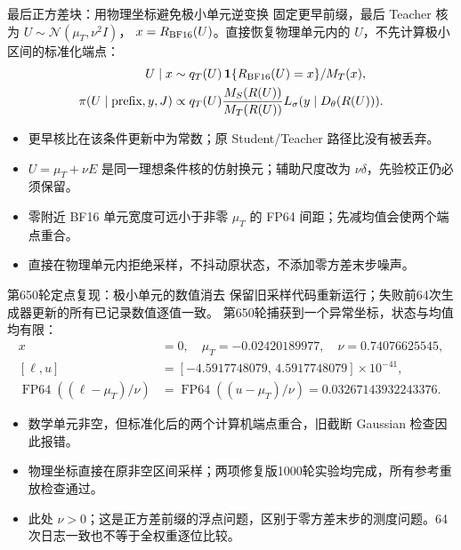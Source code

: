 \documentclass[10pt,aspectratio=169]{beamer}
\newcommand{\N}{\mathcal N}
\begin{document}
\begin{frame}{最后正方差块：用物理坐标避免极小单元逆变换}
\small
固定更早前缀，最后 Teacher 核为 $U\sim\N(\mu_T,\nu^2I)$，
$x=R_{\rm BF16}(U)$。直接恢复物理单元内的 $U$，不先计算极小区间的标准化端点：
\begin{align}
U\mid x&\sim q_T(U)\,\mathbf1\{R_{\rm BF16}(U)=x\}/M_T(x),\\
\pi(U\mid\text{prefix},y,J)&\propto q_T(U)
\frac{M_S(R(U))}{M_T(R(U))}L_\sigma(y\mid D_\theta(R(U))).
\end{align}
\begin{itemize}\itemsep5pt
\item 更早核比在该条件更新中为常数；原 Student/Teacher 路径比没有被丢弃。
\item $U=\mu_T+\nu E$ 是同一理想条件核的仿射换元；辅助尺度改为 $\nu\delta$，先验校正仍必须保留。
\item 零附近 BF16 单元宽度可远小于非零 $\mu_T$ 的 FP64 间距；先减均值会使两个端点重合。
\item 直接在物理单元内拒绝采样，不抖动原状态，不添加零方差末步噪声。
\end{itemize}
\end{frame}

\begin{frame}{第650轮定点复现：极小单元的数值消去}
\small
保留旧采样代码重新运行；失败前64次生成器更新的所有已记录数值逐值一致。
第650轮捕获到一个异常坐标，状态与均值均有限：
\begin{align}
x&=0,\quad \mu_T=-0.02420189977,\quad \nu=0.74076625545,\\
[\ell,u]&=[-4.5917748079,\,4.5917748079]\times10^{-41},\\
\operatorname{FP64}((\ell-\mu_T)/\nu)
&=\operatorname{FP64}((u-\mu_T)/\nu)=0.03267143932243376.
\end{align}
\begin{itemize}\itemsep5pt
\item 数学单元非空，但标准化后的两个计算机端点重合，旧截断 Gaussian 检查因此报错。
\item 物理坐标直接在原非空区间采样；两项修复版1000轮实验均完成，所有参考重放检查通过。
\item 此处 $\nu>0$；这是正方差前缀的浮点问题，区别于零方差末步的测度问题。64次日志一致也不等于全权重逐位比较。
\end{itemize}
\end{frame}
\end{document}
